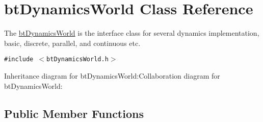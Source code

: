 \hypertarget{classbt_dynamics_world}{
\section{btDynamicsWorld Class Reference}
\label{classbt_dynamics_world}
}
The \hyperlink{classbt_dynamics_world}{btDynamicsWorld} is the interface class for several dynamics implementation, basic, discrete, parallel, and continuous etc.  


{\tt \#include $<$btDynamicsWorld.h$>$}

Inheritance diagram for btDynamicsWorld:Collaboration diagram for btDynamicsWorld:\subsection*{Public Member Functions}
